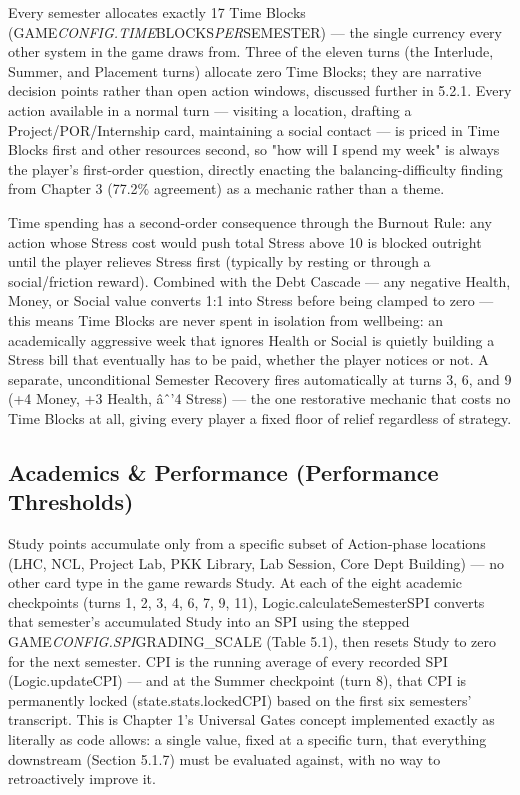 Every semester allocates exactly 17 Time Blocks (GAME\emph{CONFIG.TIME}BLOCKS\emph{PER}SEMESTER) --- the single currency every other system in the game draws from. Three of the eleven turns (the Interlude, Summer, and Placement turns) allocate zero Time Blocks; they are narrative decision points rather than open action windows, discussed further in 5.2.1. Every action available in a normal turn --- visiting a location, drafting a Project/POR/Internship card, maintaining a social contact --- is priced in Time Blocks first and other resources second, so "how will I spend my week" is always the player's first-order question, directly enacting the balancing-difficulty finding from Chapter 3 (77.2\% agreement) as a mechanic rather than a theme.

Time spending has a second-order consequence through the Burnout Rule: any action whose Stress cost would push total Stress above 10 is blocked outright until the player relieves Stress first (typically by resting or through a social/friction reward). Combined with the Debt Cascade --- any negative Health, Money, or Social value converts 1:1 into Stress before being clamped to zero --- this means Time Blocks are never spent in isolation from wellbeing: an academically aggressive week that ignores Health or Social is quietly building a Stress bill that eventually has to be paid, whether the player notices or not. A separate, unconditional Semester Recovery fires automatically at turns 3, 6, and 9 (+4 Money, +3 Health, âˆ'4 Stress) --- the one restorative mechanic that costs no Time Blocks at all, giving every player a fixed floor of relief regardless of strategy.

\subsection{Academics & Performance (Performance Thresholds)}

Study points accumulate only from a specific subset of Action-phase locations (LHC, NCL, Project Lab, PKK Library, Lab Session, Core Dept Building) --- no other card type in the game rewards Study. At each of the eight academic checkpoints (turns 1, 2, 3, 4, 6, 7, 9, 11), Logic.calculateSemesterSPI converts that semester's accumulated Study into an SPI using the stepped GAME\emph{CONFIG.SPI}GRADING_SCALE (Table 5.1), then resets Study to zero for the next semester. CPI is the running average of every recorded SPI (Logic.updateCPI) --- and at the Summer checkpoint (turn 8), that CPI is permanently locked (state.stats.lockedCPI) based on the first six semesters' transcript. This is Chapter 1's Universal Gates concept implemented exactly as literally as code allows: a single value, fixed at a specific turn, that everything downstream (Section 5.1.7) must be evaluated against, with no way to retroactively improve it.

